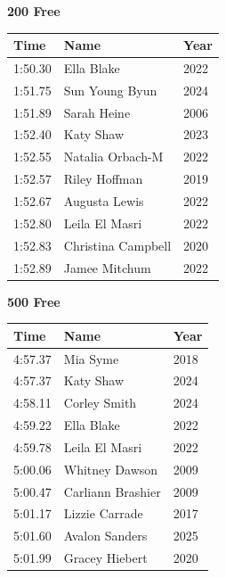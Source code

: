 \vspace{0.3em}
\vspace{1.2em}
\noindent\begin{minipage}[t]{0.48\textwidth}
\centering
\textbf{\textcolor{teamprimary}{200 Free}}\par
\vspace{0.5em}
\centering
\small
\renewcommand{\arraystretch}{1.0}
\setlength{\tabcolsep}{4pt}
\begin{tabular}{@{}p{1.8cm}p{3.0cm}p{1.0cm}@{}}
\toprule
\textbf{Time} & \textbf{Name} & \textbf{Year} \\
\midrule
1:50.30 & Ella Blake & 2022 \\
1:51.75 & Sun Young Byun & 2024 \\
1:51.89 & Sarah Heine & 2006 \\
1:52.40 & Katy Shaw & 2023 \\
1:52.55 & Natalia Orbach-M & 2022 \\
1:52.57 & Riley Hoffman & 2019 \\
1:52.67 & Augusta Lewis & 2022 \\
1:52.80 & Leila El Masri & 2022 \\
1:52.83 & Christina Campbell & 2020 \\
1:52.89 & Jamee Mitchum & 2022 \\
\bottomrule
\end{tabular}
\end{minipage}
\hfill
\begin{minipage}[t]{0.48\textwidth}
\centering
\textbf{\textcolor{teamprimary}{500 Free}}\par
\vspace{0.5em}
\centering
\small
\renewcommand{\arraystretch}{1.0}
\setlength{\tabcolsep}{4pt}
\begin{tabular}{@{}p{1.8cm}p{3.0cm}p{1.0cm}@{}}
\toprule
\textbf{Time} & \textbf{Name} & \textbf{Year} \\
\midrule
4:57.37 & Mia Syme & 2018 \\
4:57.37 & Katy Shaw & 2024 \\
4:58.11 & Corley Smith & 2024 \\
4:59.22 & Ella Blake & 2022 \\
4:59.78 & Leila El Masri & 2022 \\
5:00.06 & Whitney Dawson & 2009 \\
5:00.47 & Carliann Brashier & 2009 \\
5:01.17 & Lizzie Carrade & 2017 \\
5:01.60 & Avalon Sanders & 2025 \\
5:01.99 & Gracey Hiebert & 2020 \\
\bottomrule
\end{tabular}
\end{minipage}
